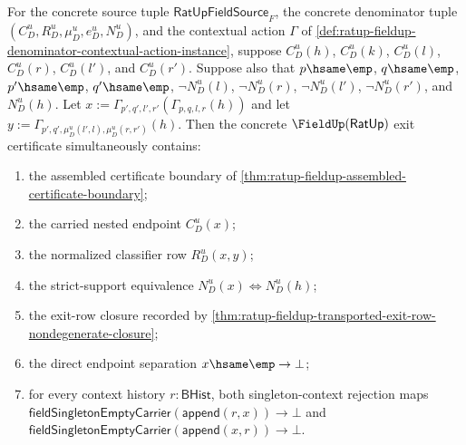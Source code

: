 \begin{theorem}
\label{thm:ratup-fieldup-normalized-contextual-separation-package}
For the concrete source tuple $\mathsf{RatUpFieldSource}_F$, the concrete
denominator tuple $(C_D^u,R_D^u,\mu_D^u,e_D^u,N_D^u)$, and the contextual
action $\Gamma$ of
\autoref{def:ratup-fieldup-denominator-contextual-action-instance}, suppose
$C_D^u(h)$, $C_D^u(k)$, $C_D^u(l)$, $C_D^u(r)$, $C_D^u(l')$, and
$C_D^u(r')$. Suppose also that $p\hsame\emp$, $q\hsame\emp$, $p'\hsame\emp$,
$q'\hsame\emp$, $\neg N_D^u(l)$, $\neg N_D^u(r)$, $\neg N_D^u(l')$,
$\neg N_D^u(r')$, and $N_D^u(h)$. Let
$x:=\Gamma_{p',q',l',r'}(\Gamma_{p,q,l,r}(h))$ and let
$y:=\Gamma_{p',q',\mu_D^u(l',l),\mu_D^u(r,r')}(h)$. Then the concrete
$\FieldUp(\mathsf{RatUp})$ exit certificate simultaneously contains:
\begin{enumerate}
  \item the assembled certificate boundary of
  \autoref{thm:ratup-fieldup-assembled-certificate-boundary};
  \item the carried nested endpoint $C_D^u(x)$;
  \item the normalized classifier row $R_D^u(x,y)$;
  \item the strict-support equivalence $N_D^u(x)\Longleftrightarrow N_D^u(h)$;
  \item the exit-row closure recorded by
  \autoref{thm:ratup-fieldup-transported-exit-row-nondegenerate-closure};
  \item the direct endpoint separation $x\hsame\emp\to\bot$;
  \item for every context history $r:\mathsf{BHist}$, both singleton-context
  rejection maps
  $\mathsf{fieldSingletonEmptyCarrier}(\mathsf{append}(r,x))\to\bot$ and
  $\mathsf{fieldSingletonEmptyCarrier}(\mathsf{append}(x,r))\to\bot$.
\end{enumerate}
\end{theorem}
